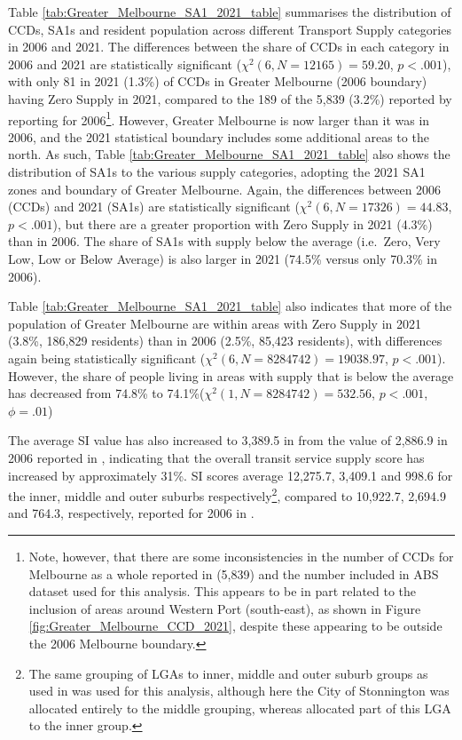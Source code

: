 \documentclass[preprint, 3p,
authoryear]{elsarticle} %
\begin{document}
Table \ref{tab:Greater_Melbourne_SA1_2021_table} summarises the
distribution of CCDs, SA1s and resident population across different
Transport Supply categories in 2006 and 2021. The differences between
the share of CCDs in each category in 2006 and 2021 are statistically
significant (\(\chi^2(6, N = 12165) = 59.20\), \(p < .001\)), with only
81 in 2021 (1.3\%) of CCDs in Greater Melbourne (2006 boundary) having
Zero Supply in 2021, compared to the 189 of the 5,839 (3.2\%) reported
by \citet{currie2010identifying} reporting for 2006\footnote{Note,
  however, that there are some inconsistencies in the number of CCDs for
  Melbourne as a whole reported in \citet{currie2010identifying} (5,839)
  and the number included in ABS dataset used for this analysis. This
  appears to be in part related to the inclusion of areas around Western
  Port (south-east), as shown in Figure
  \ref{fig:Greater_Melbourne_CCD_2021}, despite these appearing to be
  outside the 2006 Melbourne boundary.}. However, Greater Melbourne is
now larger than it was in 2006, and the 2021 statistical boundary
includes some additional areas to the north. As such, Table
\ref{tab:Greater_Melbourne_SA1_2021_table} also shows the distribution
of SA1s to the various supply categories, adopting the 2021 SA1 zones
and boundary of Greater Melbourne. Again, the differences between 2006
(CCDs) and 2021 (SA1s) are statistically significant
(\(\chi^2(6, N = 17326) = 44.83\), \(p < .001\)), but there are a
greater proportion with Zero Supply in 2021 (4.3\%) than in 2006. The
share of SA1s with supply below the average (i.e.~Zero, Very Low, Low or
Below Average) is also larger in 2021 (74.5\% versus only 70.3\% in
2006).

Table \ref{tab:Greater_Melbourne_SA1_2021_table} also indicates that
more of the population of Greater Melbourne are within areas with Zero
Supply in 2021 (3.8\%, 186,829 residents) than in 2006 (2.5\%, 85,423
residents), with differences again being statistically significant
(\(\chi^2(6, N = 8284742) = 19038.97\), \(p < .001\)). However, the
share of people living in areas with supply that is below the average
has decreased from 74.8\% to 74.1\%(\(\chi^2(1, N = 8284742) = 532.56\),
\(p < .001\), \(\phi = .01\))

The average SI value has also increased to 3,389.5 in from the value of
2,886.9 in 2006 reported in \citet{currie2010identifying}, indicating
that the overall transit service supply score has increased by
approximately 31\%. SI scores average 12,275.7, 3,409.1 and 998.6 for
the inner, middle and outer suburbs respectively\footnote{The same
  grouping of LGAs to inner, middle and outer suburb groups as used in
  \citet{currie2010identifying} was used for this analysis, although
  here the City of Stonnington was allocated entirely to the middle
  grouping, whereas \citet{currie2010identifying} allocated part of this
  LGA to the inner group.}, compared to 10,922.7, 2,694.9 and 764.3,
respectively, reported for 2006 in \citet{currie2010identifying}.
\end{document}
